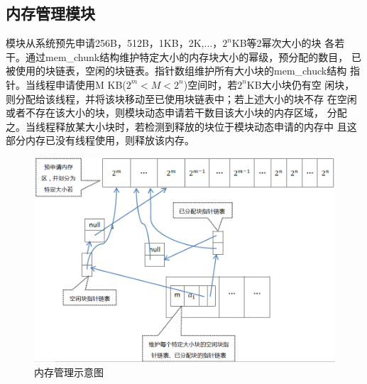 
%
\subsection{内存管理模块}
		模块从系统预先申请256B，512B，1KB，2K,$\ldots$，$2^n$KB等2幂次大小的块
		各若干。通过mem\_chunk结构维护特定大小的内存块大小的幂级，预分配的数目，
		已被使用的块链表，空闲的块链表。指针数组维护所有大小块的mem\_chuck结构
		指针。当线程申请使用M KB($2^m < M < 2^n$)空间时，若$2^n$KB大小块仍有空
		闲块，则分配给该线程，并将该块移动至已使用块链表中；若上述大小的块不存
		在空闲或者不存在该大小的块，则模块动态申请若干数目该大小块的内存区域，
		分配之。当线程释放某大小块时，若检测到释放的块位于模块动态申请的内存中
		且这部分内存已没有线程使用，则释放该内存。
\begin{figure}[H]
\centering
\includegraphics[keepaspectratio,scale=0.5]{pitures/mm.png}
\caption{内存管理示意图}
\end{figure}


